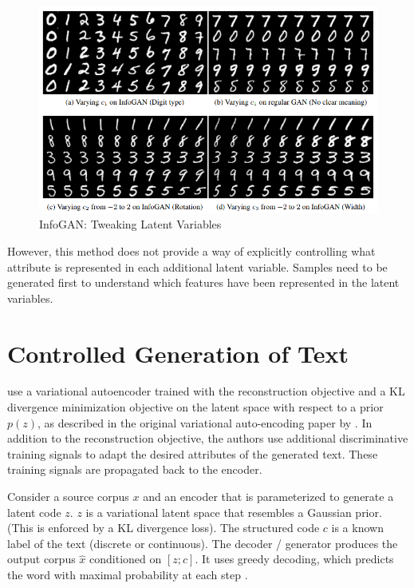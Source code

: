 \begin{figure}[ht]
	\centering
	\includegraphics[width=\textwidth]{images/infogan-digits}
	\caption{\label{fig:infogan-digits} InfoGAN: Tweaking Latent Variables}
\end{figure}

However, this method does not provide a way of explicitly controlling what attribute is represented in each additional latent variable. Samples need to be generated first to understand which features have been represented in the latent variables.


\section{Controlled Generation of Text}

\cite{hu2017toward} use a variational autoencoder trained with the reconstruction objective and a KL divergence minimization objective on the latent space with respect to a prior $p(z)$, as described in the original variational auto-encoding paper by \cite{kingma2013auto}. In addition to the reconstruction objective, the authors use additional discriminative training signals to adapt the desired attributes of the generated text. These training signals are propagated back to the encoder.

Consider a source corpus $x$ and an encoder that is parameterized to generate a latent code $z$. $z$ is a variational latent space that resembles a Gaussian prior. (This is enforced by a KL divergence loss). The structured code $c$ is a known label of the text (discrete or continuous). The decoder / generator produces the output corpus $\hat{x}$ conditioned on $[z; c]$. It uses greedy decoding, which predicts the word with maximal probability at each step \citep{langlais2007greedy}.

